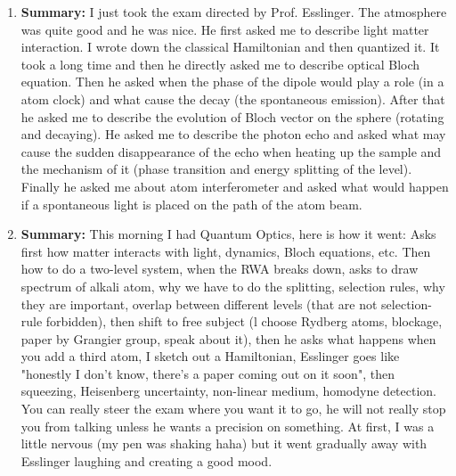 \documentclass{article}%
\begin{document}
\begin{enumerate}%
\item%
\begin{mycolorbox}%
\textbf{Summary:}%
\newline%
I just took the exam directed by Prof. Esslinger. The atmosphere was quite good and he was nice. He first asked me to describe light matter interaction. I wrote down the classical Hamiltonian and then quantized it. It took a long time and then he directly asked me to describe optical Bloch equation. Then he asked when the phase of the dipole would play a role (in a atom clock) and what cause the decay (the spontaneous emission). After that he asked me to describe the evolution of Bloch vector on the sphere (rotating and decaying).\newline%
He asked me to describe the photon echo and asked what may cause the sudden disappearance of the echo when heating up the sample and the mechanism of it (phase transition and energy splitting of the level). Finally he asked me about atom interferometer and asked what would happen if a spontaneous light is placed on the path of the atom beam.%
\end{mycolorbox}%
\item%
\textbf{Summary:}%
\newline%
This morning I had Quantum Optics, here is how it went:\newline%
Asks first how matter interacts with light, dynamics, Bloch equations, etc. Then how to do a two{-}level system, when the RWA breaks down, asks to draw spectrum of alkali atom, why we have to do the splitting, selection rules, why they are important, overlap between different levels (that are not selection{-}rule forbidden), then shift to free subject (l choose Rydberg atoms, blockage, paper by Grangier group, speak about it), then he asks what happens when you add a third atom, I sketch out a Hamiltonian, Esslinger goes like "honestly I don't know, there's a paper coming out on it soon", then squeezing, Heisenberg uncertainty, non{-}linear medium, homodyne detection. You can really steer the exam where you want it to go, he will not really stop you from talking unless he wants a precision on something. At first, I was a little nervous (my pen was shaking haha) but it went gradually away with Esslinger laughing and creating a good mood.%
\end{enumerate}%
\newpage%
\end{document}
